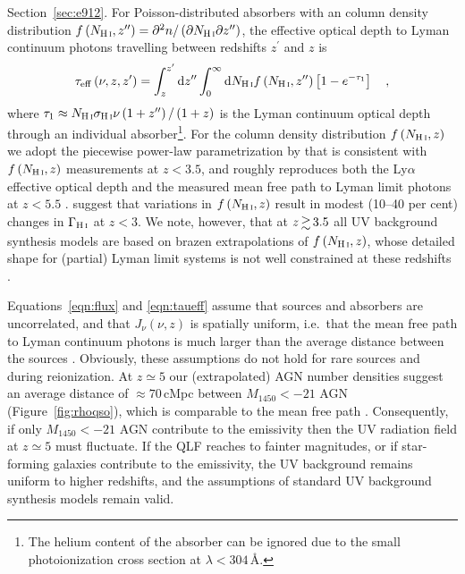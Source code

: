 \documentclass[fleqn,usenatbib]{mnras}
\begin{document}
Section~\ref{sec:e912}.  For Poisson-distributed absorbers with an
 column density distribution
$f\left(N_\ion{H}{i},z^{\prime\prime}\right)=\partial^2n/\left(\partial
N_\ion{H}{i}\partial z^{\prime\prime}\right)$, the effective optical
depth to  Lyman continuum photons travelling between
redshifts $z^\prime$ and $z$ is \citep{1980ApJ...240..387P}
\begin{equation}
  \tau_\mathrm{eff}\left(\nu,z,z^\prime\right) = \int_{z}^{z^\prime}\mathrm{d}z^{\prime\prime}\int_0^\infty
  \mathrm{d}N_\ion{H}{i} f\left(N_\ion{H}{i},z^{\prime\prime}\right)\left[1-e^{-\tau_1}\right]\quad,
   \label{eqn:taueff}
\end{equation}
where $\tau_1\approx
N_\ion{H}{i}\sigma_\ion{H}{i}\nu\left(1+z^{\prime\prime}\right)/\left(1+z\right)$
is the Lyman continuum optical depth through an individual
absorber\footnote{The helium content of the absorber can be ignored
  due to the small  photoionization cross section at
  $\lambda<304$\,\AA.}.  For the  column density
distribution $f\left(N_\ion{H}{i},z\right)$ we adopt the piecewise
power-law parametrization by \citet{2012ApJ...746..125H} that is
consistent with $f\left(N_\ion{H}{i},z\right)$ measurements at
$z<3.5$, and roughly reproduces both the  Ly$\alpha$
effective optical depth \citep[but not in detail---see][]{2015MNRAS.450.4081P,2017MNRAS.464..897B,2017ApJ...837..106O}
and the measured mean free path to  Lyman limit photons at
$z<5.5$ \citep{2009ApJ...705L.113P,2014MNRAS.445.1745W}.
\citet{2018arXiv180109693K} suggest that variations in
$f\left(N_\ion{H}{i},z\right)$ result in modest (10--40 per cent)
changes in $\Gamma_\ion{H}{i}$ at $z<3$. We note, however, that at
$z\ga 3.5$ all UV background synthesis models are based on brazen
extrapolations of $f\left(N_\ion{H}{i},z\right)$, whose detailed shape
for (partial) Lyman limit systems is not well constrained at these
redshifts \citep{2010ApJ...718..392P}.

Equations~\eqref{eqn:flux} and \eqref{eqn:taueff} assume that sources
and absorbers are uncorrelated, and that $J_\nu(\nu, z)$ is spatially
uniform, i.e.\ that the mean free path to  Lyman continuum
photons is much larger than the average distance between the sources
\citep[e.g.][]{1999ApJ...514..648M,2004MNRAS.350.1107M,2009ApJ...703.1416F,2012ApJ...746..125H}.
Obviously, these assumptions do not hold for rare sources and during
 reionization.  At $z\simeq 5$ our (extrapolated) AGN number
densities suggest an average distance of $\approx 70$\,cMpc between
$M_{1450}<-21$ AGN (Figure~\ref{fig:rhoqso}), which is comparable to
the mean free path \citep[$83\pm 10$\,cMpc,][]{2014MNRAS.445.1745W}.
Consequently, if only $M_{1450}<-21$ AGN contribute to the emissivity
then the UV radiation field at $z\simeq 5$ must fluctuate.  If the QLF
reaches to fainter magnitudes, or if star-forming galaxies contribute
to the emissivity, the UV background remains uniform to higher
redshifts, and the assumptions of standard UV background synthesis
models remain valid.
\end{document}
